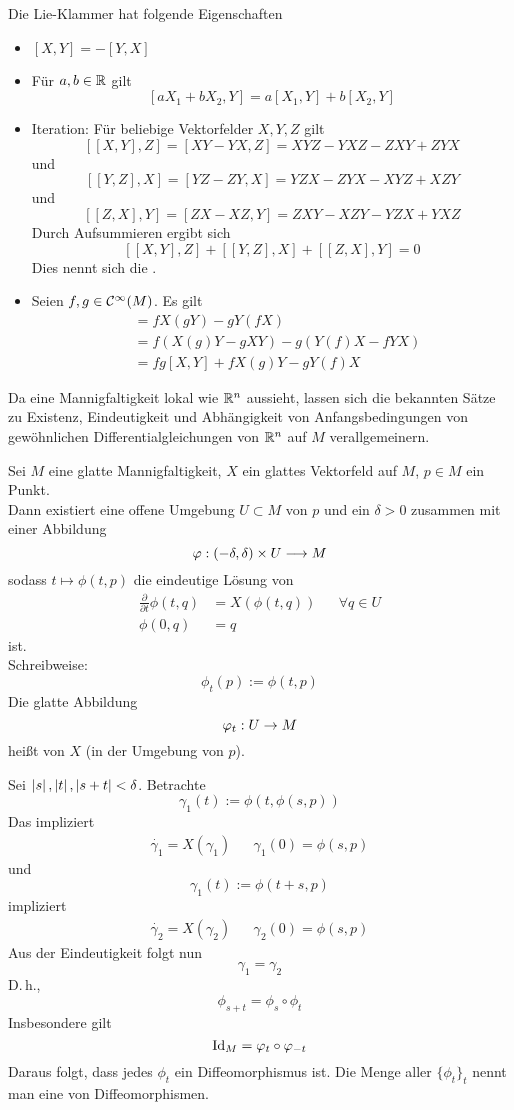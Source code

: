 \Bem{}
Die Lie-Klammer hat folgende Eigenschaften
\begin{itemize}
	\item $[X,Y] = - [Y,X]$
	\item Für $a,b \in \mathbb{R}$ gilt
	\[ [aX_1 + bX_2, Y] = a[X_1, Y] + b[X_2, Y] \]
	\item Iteration: Für beliebige Vektorfelder $X,Y,Z$ gilt
	\[ [[X,Y], Z] = [ XY - YX, Z ] = XYZ- YXZ - ZXY + ZYX \]
	und
	\[ [[Y,Z], X] = [ YZ - ZY, X ] = YZX- ZYX - XYZ + XZY \]
	und
	\[ [[Z,X], Y] = [ ZX - XZ, Y ] = ZXY - XZY - YZX + YXZ \]
	Durch Aufsummieren ergibt sich
	\[ [[X,Y], Z] + [[Y,Z], X]  + [[Z,X], Y] = 0\]
	Dies nennt sich die .
	\item Seien $f,g \in \mathcal{C}^{\infty}(M)$. Es gilt
	\begin{align*}
	[fX, gY] &= fX(gY) - gY(fX) \\
	&= f(X(g)Y - gXY) - g(Y(f)X - fYX) \\
	&= fg[X,Y] + fX(g) Y - gY(f)X
	\end{align*}
\end{itemize}

\newcommand{\pf}[2]{\frac{\partial #1}{\partial #2}}
Da eine Mannigfaltigkeit lokal wie $\mathbb{R}^n$ aussieht, lassen sich die bekannten Sätze zu Existenz, Eindeutigkeit und Abhängigkeit von Anfangsbedingungen von gewöhnlichen Differentialgleichungen von $\mathbb{R}^n$ auf $M$ verallgemeinern.

\Satz{}
Sei $M$ eine glatte Mannigfaltigkeit, $X$ ein glattes Vektorfeld auf $M$, $p \in M$ ein Punkt.\\
Dann existiert eine offene Umgebung $U \subset M$ von $p$ und ein $\delta > 0$ zusammen mit einer Abbildung
\[ \varphi : (-\delta, \delta) \times U \overset{}{\longrightarrow} M \]
sodass $t \mapsto \phi(t,p)$ die eindeutige Lösung von
\begin{align*}
\pf{}{t} \phi(t,q) &= X(\phi(t,q)) && \forall q \in U\\
\phi(0,q) &= q
\end{align*}
ist.\\
Schreibweise:
\[ \phi_t(p) := \phi(t,p) \]
Die glatte Abbildung
\[ \varphi_t : U\overset{}{\rightarrow} M \]
heißt  von $X$ (in der Umgebung von $p$).

\Bem{}
Sei $\left|s\right|, \left|t\right|, \left|s+t\right| < \delta$. Betrachte
\[ \gamma_1(t) := \phi(t, \phi(s,p)) \]
Das impliziert
\begin{align*}
\dot{\gamma_1} = X(\gamma_1) && \gamma_1(0) = \phi(s,p)
\end{align*}
und
\[ \gamma_1(t) := \phi(t+s, p) \]
impliziert
\begin{align*}
\dot{\gamma_2} = X(\gamma_2) && \gamma_2(0) = \phi(s,p)
\end{align*}
Aus der Eindeutigkeit folgt nun
\[ \gamma_1 = \gamma_2 \]
D.\,h.,
\[ \phi_{s+t} = \phi_s \circ \phi_t \]
Insbesondere gilt
\[ \text{Id}_{M} = \varphi_t\circ \varphi_{-t} \]
Daraus folgt, dass jedes $\phi_t$ ein Diffeomorphismus ist. Die Menge aller $\{\phi_t\}_{t}$ nennt man eine  von Diffeomorphismen.

